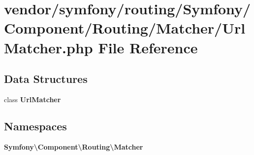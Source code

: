 \section{vendor/symfony/routing/\+Symfony/\+Component/\+Routing/\+Matcher/\+Url\+Matcher.php File Reference}
\label{_url_matcher_8php}
\subsection*{Data Structures}
\begin{DoxyCompactItemize}
\item 
class {\bf Url\+Matcher}
\end{DoxyCompactItemize}
\subsection*{Namespaces}
\begin{DoxyCompactItemize}
\item 
 {\bf Symfony\textbackslash{}\+Component\textbackslash{}\+Routing\textbackslash{}\+Matcher}
\end{DoxyCompactItemize}

